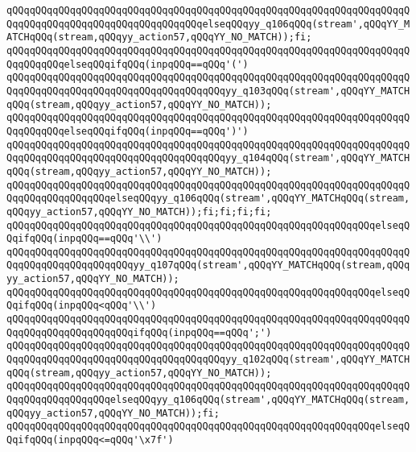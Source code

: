 \verb|qQQqqQQqqQQqqQQqqQQqqQQqqQQqqQQqqQQqqQQqqQQqqQQqqQQqqQQqqQQqqQQqqQQqqQQqqQQqqQQqqQQqqQQqqQQqqQQqqQQqqQQqelseqQQqyy_q106qQQq(stream',qQQqYY_MATCHqQQq(stream,qQQqyy_action57,qQQqYY_NO_MATCH));fi;|\newline
\verb|qQQqqQQqqQQqqQQqqQQqqQQqqQQqqQQqqQQqqQQqqQQqqQQqqQQqqQQqqQQqqQQqqQQqqQQqqQQqqQQqelseqQQqifqQQq(inpqQQq==qQQq'(')|\newline
\verb|qQQqqQQqqQQqqQQqqQQqqQQqqQQqqQQqqQQqqQQqqQQqqQQqqQQqqQQqqQQqqQQqqQQqqQQqqQQqqQQqqQQqqQQqqQQqqQQqqQQqqQQqqQQqyy_q103qQQq(stream',qQQqYY_MATCHqQQq(stream,qQQqyy_action57,qQQqYY_NO_MATCH));|\newline
\verb|qQQqqQQqqQQqqQQqqQQqqQQqqQQqqQQqqQQqqQQqqQQqqQQqqQQqqQQqqQQqqQQqqQQqqQQqqQQqqQQqelseqQQqifqQQq(inpqQQq==qQQq')')|\newline
\verb|qQQqqQQqqQQqqQQqqQQqqQQqqQQqqQQqqQQqqQQqqQQqqQQqqQQqqQQqqQQqqQQqqQQqqQQqqQQqqQQqqQQqqQQqqQQqqQQqqQQqqQQqqQQqyy_q104qQQq(stream',qQQqYY_MATCHqQQq(stream,qQQqyy_action57,qQQqYY_NO_MATCH));|\newline
\verb|qQQqqQQqqQQqqQQqqQQqqQQqqQQqqQQqqQQqqQQqqQQqqQQqqQQqqQQqqQQqqQQqqQQqqQQqqQQqqQQqqQQqqQQqelseqQQqyy_q106qQQq(stream',qQQqYY_MATCHqQQq(stream,qQQqyy_action57,qQQqYY_NO_MATCH));fi;fi;fi;fi;|\newline
\verb|qQQqqQQqqQQqqQQqqQQqqQQqqQQqqQQqqQQqqQQqqQQqqQQqqQQqqQQqqQQqqQQqelseqQQqifqQQq(inpqQQq==qQQq'\\')|\newline
\verb|qQQqqQQqqQQqqQQqqQQqqQQqqQQqqQQqqQQqqQQqqQQqqQQqqQQqqQQqqQQqqQQqqQQqqQQqqQQqqQQqqQQqqQQqqQQqyy_q107qQQq(stream',qQQqYY_MATCHqQQq(stream,qQQqyy_action57,qQQqYY_NO_MATCH));|\newline
\verb|qQQqqQQqqQQqqQQqqQQqqQQqqQQqqQQqqQQqqQQqqQQqqQQqqQQqqQQqqQQqqQQqelseqQQqifqQQq(inpqQQq<qQQq'\\')|\newline
\verb|qQQqqQQqqQQqqQQqqQQqqQQqqQQqqQQqqQQqqQQqqQQqqQQqqQQqqQQqqQQqqQQqqQQqqQQqqQQqqQQqqQQqqQQqqQQqifqQQq(inpqQQq==qQQq';')|\newline
\verb|qQQqqQQqqQQqqQQqqQQqqQQqqQQqqQQqqQQqqQQqqQQqqQQqqQQqqQQqqQQqqQQqqQQqqQQqqQQqqQQqqQQqqQQqqQQqqQQqqQQqqQQqqQQqyy_q102qQQq(stream',qQQqYY_MATCHqQQq(stream,qQQqyy_action57,qQQqYY_NO_MATCH));|\newline
\verb|qQQqqQQqqQQqqQQqqQQqqQQqqQQqqQQqqQQqqQQqqQQqqQQqqQQqqQQqqQQqqQQqqQQqqQQqqQQqqQQqqQQqqQQqelseqQQqyy_q106qQQq(stream',qQQqYY_MATCHqQQq(stream,qQQqyy_action57,qQQqYY_NO_MATCH));fi;|\newline
\verb|qQQqqQQqqQQqqQQqqQQqqQQqqQQqqQQqqQQqqQQqqQQqqQQqqQQqqQQqqQQqqQQqelseqQQqifqQQq(inpqQQq<=qQQq'\x7f')|\newline

